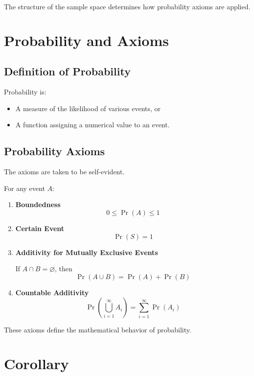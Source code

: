 \documentclass[12pt,a4paper]{article}
\begin{document}
The structure of the sample space determines how probability axioms are applied.

\section{Probability and Axioms}

\subsection{Definition of Probability}

Probability is:
\begin{itemize}
    \item A measure of the likelihood of various events, or
    \item A function assigning a numerical value to an event.
\end{itemize}

\subsection{Probability Axioms}

The axioms are taken to be self-evident.

For any event $A$:

\begin{enumerate}
    \item \textbf{Boundedness}
    \[
    0 \leq \Pr(A) \leq 1
    \]

    \item \textbf{Certain Event}
    \[
    \Pr(S) = 1
    \]

    \item \textbf{Additivity for Mutually Exclusive Events}
    
    If $A \cap B = \varnothing$, then
    \[
    \Pr(A \cup B) = \Pr(A) + \Pr(B)
    \]

    \item \textbf{Countable Additivity}
    \[
    \Pr\left(\bigcup_{i=1}^{\infty} A_i\right)
    =
    \sum_{i=1}^{\infty} \Pr(A_i)
    \]
\end{enumerate}

These axioms define the mathematical behavior of probability.

\section{Corollary}
\end{document}
